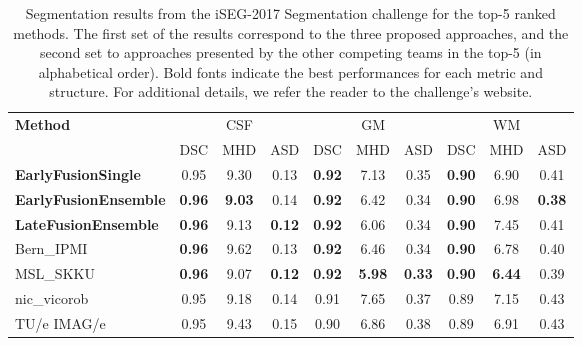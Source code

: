 \documentclass[twoside,espcrc2]{elsarticle}
\begin{document}
\begin{table}[ht!]
\centering
\caption{Segmentation results from the iSEG-2017 Segmentation challenge for the top-5 ranked methods. The first set of the results correspond to the three proposed approaches, and the second set to approaches presented by the other competing teams in the top-5 (in alphabetical order). Bold fonts indicate the best performances for each metric and structure. For additional details, we refer the reader to the challenge's website.}
\label{table:results}
\begin{small}
\begin{tabular}{lccccccccc}
\toprule
\multirow{2}[3]{*}{\textbf{Method}} & \multicolumn{3}{c}{{CSF}} & \multicolumn{3}{c}{{GM}} & \multicolumn{3}{c}{{WM}} \\
\cmidrule(lr){2-4}\cmidrule(lr){5-7}\cmidrule(lr){8-10}
& {DSC} & {MHD} & {ASD} & \multicolumn{1}{l}{{DSC}} & \multicolumn{1}{l}{{MHD}} & \multicolumn{1}{l}{{ASD}} & \multicolumn{1}{l}{{DSC}} & \multicolumn{1}{l}{{MHD}} & \multicolumn{1}{l}{{ASD}} \\
\midrule\midrule
\textbf{EarlyFusionSingle}      & 0.95  & 9.30  & 0.13 & \textbf{0.92} & 7.13 & 0.35 & \textbf{0.90} & 6.90 & 0.41  \\
\textbf{EarlyFusionEnsemble} & \textbf{0.96} & \textbf{9.03} & 0.14 & \textbf{0.92} & 6.42  & 0.34  & \textbf{0.90}  & 6.98  & \textbf{0.38}\\
\textbf{LateFusionEnsemble} & \textbf{0.96} & 9.13   & \textbf{0.12}  &  \textbf{0.92} & 6.06 & 0.34  & \textbf{0.90}  & 7.45 & 0.41\\
\midrule
Bern\_IPMI & \textbf{0.96} & 9.62 & 0.13 & \textbf{0.92} & 6.46 & 0.34 & \textbf{0.90} & 6.78 & 0.40 \\
MSL\_SKKU & \textbf{0.96} & 9.07 & \textbf{0.12} & \textbf{0.92} & \textbf{5.98} & \textbf{0.33} & \textbf{0.90} & \textbf{6.44} & 0.39 \\
nic\_vicorob & 0.95 & 9.18 & 0.14 & 0.91 & 7.65 & 0.37 & 0.89 & 7.15 & 0.43 \\
TU/e IMAG/e & 0.95  & 9.43  & 0.15 & 0.90 & 6.86 & 0.38 & 0.89 & 6.91 & 0.43  \\

\bottomrule
\end{tabular}
\end{small}
\end{table}
\end{document}
